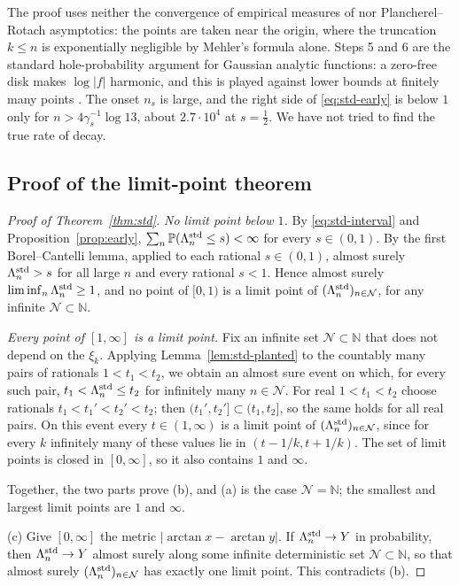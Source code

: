 \documentclass[11pt]{amsart}
\theoremstyle{definition}
\theoremstyle{remark}
\numberwithin{equation}{section}
\newcommand{\N}{\mathbb{N}}
\newcommand{\PP}{\mathbb{P}}
\begin{document}
The proof uses neither the convergence of empirical measures of \cite{HHJK} nor Plancherel--Rotach asymptotics: the points are taken near the origin, where the truncation $k\le n$ is exponentially negligible by Mehler's formula alone. Steps 5 and 6 are the standard hole-probability argument for Gaussian analytic functions: a zero-free disk makes $\log|f|$ harmonic, and this is played against lower bounds at finitely many points \cite{ST}. The onset $n_s$ is large, and the right side of \eqref{eq:std-early} is below $1$ only for $n>4\gamma_s^{-1}\log13$, about $2.7\cdot10^4$ at $s=\frac12$. We have not tried to find the true rate of decay.

\subsection{Proof of the limit-point theorem}

\begin{proof}[Proof of Theorem~\ref{thm:std}]
\emph{No limit point below $1$.} By \eqref{eq:std-interval} and Proposition~\ref{prop:early}, $\sum_n\PP(\Lambda_n^{\rm std}\le s)<\infty$ for every $s\in(0,1)$. By the first Borel--Cantelli lemma, applied to each rational $s\in(0,1)$, almost surely $\Lambda_n^{\rm std}>s$ for all large $n$ and every rational $s<1$. Hence almost surely $\liminf_n\Lambda_n^{\rm std}\ge1$, and no point of $[0,1)$ is a limit point of $(\Lambda_n^{\rm std})_{n\in\mathcal N}$, for any infinite $\mathcal N\subset\N$.

\emph{Every point of $[1,\infty]$ is a limit point.} Fix an infinite set $\mathcal N\subset\N$ that does not depend on the $\xi_k$. Applying Lemma~\ref{lem:std-planted} to the countably many pairs of rationals $1<t_1<t_2$, we obtain an almost sure event on which, for every such pair, $t_1<\Lambda_n^{\rm std}\le t_2$ for infinitely many $n\in\mathcal N$. For real $1<t_1<t_2$ choose rationals $t_1<t_1'<t_2'<t_2$; then $(t_1',t_2']\subset(t_1,t_2]$, so the same holds for all real pairs. On this event every $t\in(1,\infty)$ is a limit point of $(\Lambda_n^{\rm std})_{n\in\mathcal N}$, since for every $k$ infinitely many of these values lie in $(t-1/k,t+1/k)$. The set of limit points is closed in $[0,\infty]$, so it also contains $1$ and $\infty$.

Together, the two parts prove (b), and (a) is the case $\mathcal N=\N$; the smallest and largest limit points are $1$ and $\infty$.

(c) Give $[0,\infty]$ the metric $|\arctan x-\arctan y|$. If $\Lambda_n^{\rm std}\to Y$ in probability, then $\Lambda_n^{\rm std}\to Y$ almost surely along some infinite deterministic set $\mathcal N\subset\N$, so that almost surely $(\Lambda_n^{\rm std})_{n\in\mathcal N}$ has exactly one limit point. This contradicts (b).
\end{proof}
\end{document}
